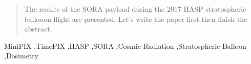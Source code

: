 \documentclass[final,1p, times, twocolumn]{elsarticle}
\begin{document}
\begin{frontmatter}

\begin{abstract}

The results of the SORA payload during the 2017 HASP stratospheric ballooon flight are presented. Let's write the paper first then finish the abstract.
\end{abstract}



\begin{keyword}
MiniPIX \sep TimePIX \sep HASP \sep SORA \sep Cosmic Radiation \sep Stratospheric Balloon \sep Dosimetry


\end{keyword}



\end{frontmatter}
\end{document}
